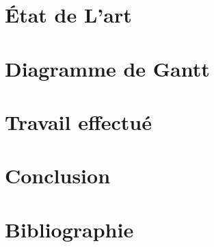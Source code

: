 \documentclass{rapport de stage}
\begin{document}

\section{État de L'art}

\newpage


\section{Diagramme de Gantt}

\newpage

\section{Travail effectué}

\newpage


\section{Conclusion} 

\newpage


\section{Bibliographie}

\cite{esteban2017realvalued}
\cite{srinivasan2022timeseries}
\cite{timeGAN}
\cite{article}
\cite{article2}
\newpage
\end{document}
